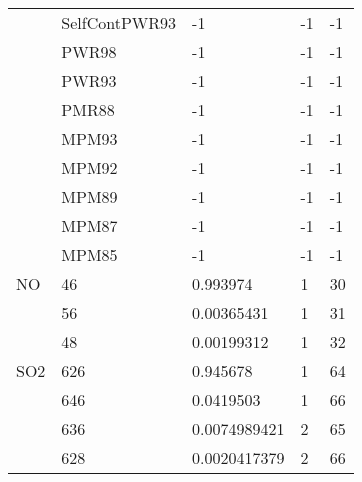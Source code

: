 \begin{longtable}{lllll}
    &SelfContPWR93&             -1      &-1     &-1     \\
    &PWR98&                     -1      &-1     &-1     \\
    &PWR93&                     -1      &-1     &-1     \\
    &PMR88&                     -1      &-1     &-1     \\
    &MPM93&                     -1      &-1     &-1     \\
    &MPM92&                     -1      &-1     &-1     \\
    &MPM89&                     -1      &-1     &-1     \\
    &MPM87&                     -1      &-1     &-1     \\
    &MPM85&                     -1      &-1     &-1     \\
\hline                  
  NO& 46&  0.993974&  1&30\\
    & 56&  0.00365431&  1&31\\
    & 48&  0.00199312&  1&32\\
\hline                  
  SO2& 626&  0.945678&  1&64\\
     & 646&  0.0419503&  1&66\\
     & 636&  0.0074989421&  2&65\\
     & 628&  0.0020417379&  2&66\\


\end{longtable}

